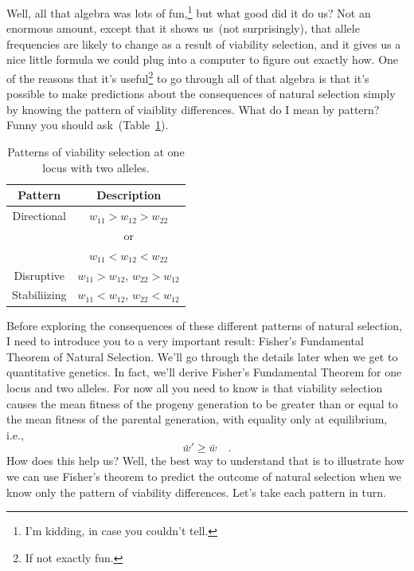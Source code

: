 Well, all that algebra was lots of fun,\footnote{I'm kidding, in case
  you couldn't tell.} but what good did it do us? Not an enormous
amount, except that it shows us~(not surprisingly), that allele
frequencies are likely to change as a result of viability selection,
and it gives us a nice little formula we could plug into a computer to
figure out exactly how. One of the reasons that it's
useful\footnote{If not exactly fun.} to go through all of that algebra
is that it's possible to make predictions about the consequences of
natural selection simply by knowing the pattern of viaiblity
differences. What do I mean by pattern? Funny you should
ask~(Table~\ref{table:patterns}).

\begin{table}
\begin{center}
\begin{tabular}{cc}
\hline\hline
Pattern & Description \\
\hline
Directional & $w_{11} > w_{12} > w_{22}$ \\
            & or \\
            & $w_{11} < w_{12} < w_{22}$ \\
Disruptive  & $w_{11} > w_{12}$, $w_{22} > w_{12}$ \\
Stabiliizing& $w_{11} < w_{12}$, $w_{22} < w_{12}$ \\
\hline
\end{tabular}
\end{center}
\caption{Patterns of viability selection at one locus with two alleles.}\label{table:patterns}
\end{table}

Before exploring the consequences of these different patterns of
natural selection, I need to introduce you to a very important result:
Fisher's Fundamental Theorem of Natural Selection. We'll go through
the details later when we get to quantitative genetics. In fact, we'll
derive Fisher's Fundamental Theorem for one locus and two alleles. For
now all you need to know is that viability selection causes the mean
fitness of the progeny generation to be greater than or equal to the
mean fitness of the parental generation, with equality only at
equilibrium, i.e.,
\[
\bar w' \ge \bar w \quad .
\]
How does this help us? Well, the best way to understand that is to
illustrate how we can use Fisher's theorem to predict the outcome of
natural selection when we know only the pattern of viability
differences. Let's take each pattern in turn.


